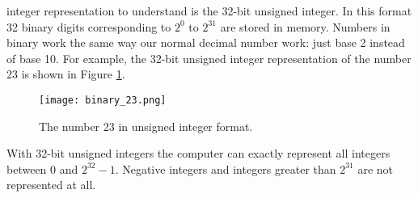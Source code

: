  integer representation to understand is the 32-bit unsigned integer. In this format 32 binary digits corresponding to $2^0$ to $2^{31}$ are stored in memory.  Numbers in binary work the same way our normal decimal number work: just base 2 instead of base 10.  For example, the 32-bit unsigned integer representation of the number 23 is shown in Figure \ref{fig:lec1n-binary-23}.


\begin{figure}[h!]
\texttt{[image: binary\_23.png]}
\caption{The number 23 in unsigned integer format.}
\label{fig:lec1n-binary-23}
\end{figure}



With 32-bit unsigned integers the computer can exactly represent all integers between 0 and $2^{32}-1$. Negative integers and integers greater than $2^{31}$ are not represented at all.%




